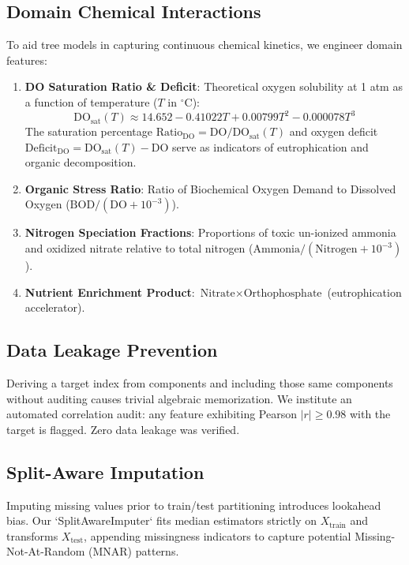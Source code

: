 \documentclass[conference]{IEEEtran}
\begin{document}
\subsection{Domain Chemical Interactions}
To aid tree models in capturing continuous chemical kinetics, we engineer domain features:
\begin{enumerate}
    \item \textbf{DO Saturation Ratio \& Deficit}: Theoretical oxygen solubility at 1 atm as a function of temperature ($T$ in $^\circ\text{C}$):
    \begin{equation}
    \text{DO}_{\text{sat}}(T) \approx 14.652 - 0.41022 T + 0.00799 T^2 - 0.000078 T^3
    \end{equation}
    The saturation percentage $\text{Ratio}_{\text{DO}} = \text{DO} / \text{DO}_{\text{sat}}(T)$ and oxygen deficit $\text{Deficit}_{\text{DO}} = \text{DO}_{\text{sat}}(T) - \text{DO}$ serve as indicators of eutrophication and organic decomposition.
    \item \textbf{Organic Stress Ratio}: Ratio of Biochemical Oxygen Demand to Dissolved Oxygen ($\text{BOD} / (\text{DO} + 10^{-3})$).
    \item \textbf{Nitrogen Speciation Fractions}: Proportions of toxic un-ionized ammonia and oxidized nitrate relative to total nitrogen ($\text{Ammonia} / (\text{Nitrogen} + 10^{-3})$).
    \item \textbf{Nutrient Enrichment Product}: $\text{Nitrate} \times \text{Orthophosphate}$ (eutrophication accelerator).
\end{enumerate}

\subsection{Data Leakage Prevention}
Deriving a target index from components and including those same components without auditing causes trivial algebraic memorization. We institute an automated correlation audit: any feature exhibiting Pearson $|r| \ge 0.98$ with the target is flagged. Zero data leakage was verified.

\subsection{Split-Aware Imputation}
Imputing missing values prior to train/test partitioning introduces lookahead bias. Our `SplitAwareImputer` fits median estimators strictly on $X_{\text{train}}$ and transforms $X_{\text{test}}$, appending missingness indicators to capture potential Missing-Not-At-Random (MNAR) patterns.
\end{document}
